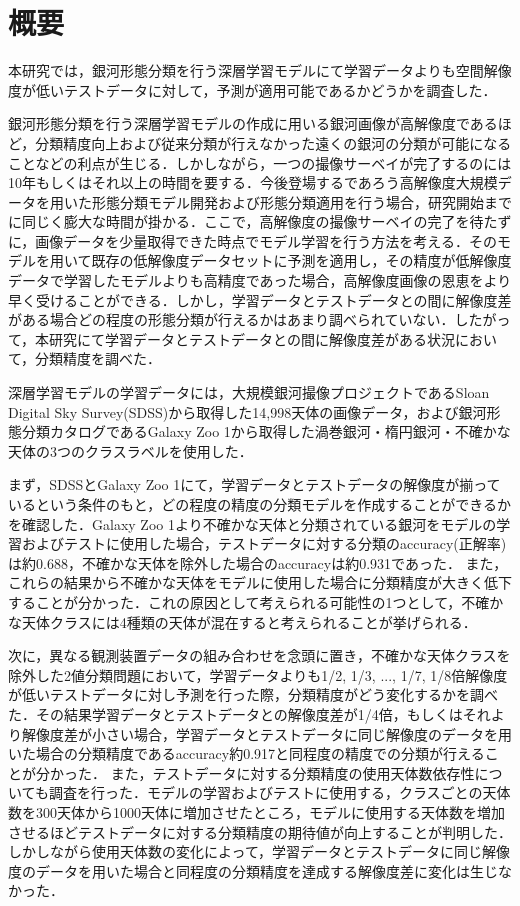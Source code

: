 \documentclass[a4j, 11pt]{jreport}
\begin{document}
\chapter*{概要}
本研究では，銀河形態分類を行う深層学習モデルにて学習データよりも空間解像度が低いテストデータに対して，予測が適用可能であるかどうかを調査した．

銀河形態分類を行う深層学習モデルの作成に用いる銀河画像が高解像度であるほど，分類精度向上および従来分類が行えなかった遠くの銀河の分類が可能になることなどの利点が生じる．しかしながら，一つの撮像サーベイが完了するのには10年もしくはそれ以上の時間を要する．今後登場するであろう高解像度大規模データを用いた形態分類モデル開発および形態分類適用を行う場合，研究開始までに同じく膨大な時間が掛かる．ここで，高解像度の撮像サーベイの完了を待たずに，画像データを少量取得できた時点でモデル学習を行う方法を考える．そのモデルを用いて既存の低解像度データセットに予測を適用し，その精度が低解像度データで学習したモデルよりも高精度であった場合，高解像度画像の恩恵をより早く受けることができる．しかし，学習データとテストデータとの間に解像度差がある場合どの程度の形態分類が行えるかはあまり調べられていない．したがって，本研究にて学習データとテストデータとの間に解像度差がある状況において，分類精度を調べた．

深層学習モデルの学習データには，大規模銀河撮像プロジェクトであるSloan Digital Sky Survey(SDSS)から取得した14,998天体の画像データ，および銀河形態分類カタログであるGalaxy Zoo 1から取得した渦巻銀河・楕円銀河・不確かな天体の3つのクラスラベルを使用した．

まず，SDSSとGalaxy Zoo 1にて，学習データとテストデータの解像度が揃っているという条件のもと，どの程度の精度の分類モデルを作成することができるかを確認した．Galaxy Zoo 1より不確かな天体と分類されている銀河をモデルの学習およびテストに使用した場合，テストデータに対する分類のaccuracy(正解率)は約0.688，不確かな天体を除外した場合のaccuracyは約0.931であった．
また，これらの結果から不確かな天体をモデルに使用した場合に分類精度が大きく低下することが分かった．これの原因として考えられる可能性の1つとして，不確かな天体クラスには4種類の天体が混在すると考えられることが挙げられる．


次に，異なる観測装置データの組み合わせを念頭に置き，不確かな天体クラスを除外した2値分類問題において，学習データよりも1/2, 1/3, ..., 1/7, 1/8倍解像度が低いテストデータに対し予測を行った際，分類精度がどう変化するかを調べた．その結果学習データとテストデータとの解像度差が1/4倍，もしくはそれより解像度差が小さい場合，学習データとテストデータに同じ解像度のデータを用いた場合の分類精度であるaccuracy約0.917と同程度の精度での分類が行えることが分かった．
また，テストデータに対する分類精度の使用天体数依存性についても調査を行った．モデルの学習およびテストに使用する，クラスごとの天体数を300天体から1000天体に増加させたところ，モデルに使用する天体数を増加させるほどテストデータに対する分類精度の期待値が向上することが判明した．
しかしながら使用天体数の変化によって，学習データとテストデータに同じ解像度のデータを用いた場合と同程度の分類精度を達成する解像度差に変化は生じなかった．
\end{document}
